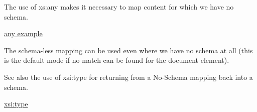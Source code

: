 The use of xs:any makes it necessary to map content for which we have no schema.


\begin{DoxyItemize}
\item \hyperlink{any}{any example}
\end{DoxyItemize}

The schema-\/less mapping can be used even where we have no schema at all (this is the default mode if no match can be found for the document element).

See also the use of xsi:type for returning from a No-\/Schema mapping back into a schema.
\begin{DoxyItemize}
\item \hyperlink{type}{xsi:type} 
\end{DoxyItemize}